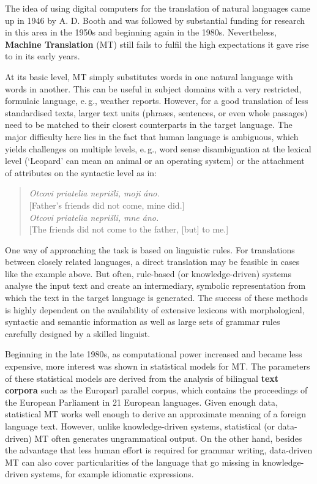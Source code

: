 \begin{multicols}{2}
The idea of using digital computers for the translation of natural languages came up in 1946 by A. D. Booth and was followed by substantial funding for research in this area in the 1950s and beginning again in the 1980s. Nevertheless, \textbf{Machine Translation} (MT) still fails to fulfil the high expectations it gave rise to in its early years. 

At its basic level, MT simply substitutes words in one natural language with words in another. This can be useful in subject domains with a very restricted, formulaic language, e.\,g., weather reports. However, for a good translation of less standardised texts, larger text units (phrases, sentences, or even whole passages) need to be matched to their closest counterparts in the target language. The major difficulty here lies in the fact that human language is ambiguous, which yields challenges on multiple levels, e.\,g., word sense disambiguation at the lexical level (‘Leopard’ can mean an animal or an operating system) or the attachment of attributes on the syntactic level as in:

\begin{verse}
\emph{Otcovi priatelia neprišli, moji áno.}\\
{[}Father's friends did not come, mine did.{]}\\
\smallskip
\emph{Otcovi priatelia neprišli, mne áno.}\\
{[}The friends did not come to the father, {[}but{]} to me.{]}
\end{verse}

One way of approaching the task is based on linguistic rules. For translations between closely related languages, a direct translation may be feasible in cases like the example above. But often, rule-based (or knowledge-driven) systems analyse the input text and create an intermediary, symbolic representation from which the text in the target language is generated. The success of these methods is highly dependent on the availability of extensive lexicons with morphological, syntactic and semantic information as well as large sets of grammar rules carefully designed by a skilled linguist.

Beginning in the late 1980s, as computational power increased and became less expensive, more interest was shown in statistical models for MT. The parameters of these statistical models are derived from the analysis of bilingual \textbf{text corpora} such as the Europarl parallel corpus, which contains the proceedings of the European Parliament in 21 European languages. Given enough data, statistical MT works well enough to derive an approximate meaning of a foreign language text. However, unlike knowledge-driven systems, statistical (or data-driven) MT often generates ungrammatical output. On the other hand, besides the advantage that less human effort is required for grammar writing, data-driven MT can also cover particularities of the language that go missing in knowledge-driven systems, for example idiomatic expressions. 


\end{multicols}
